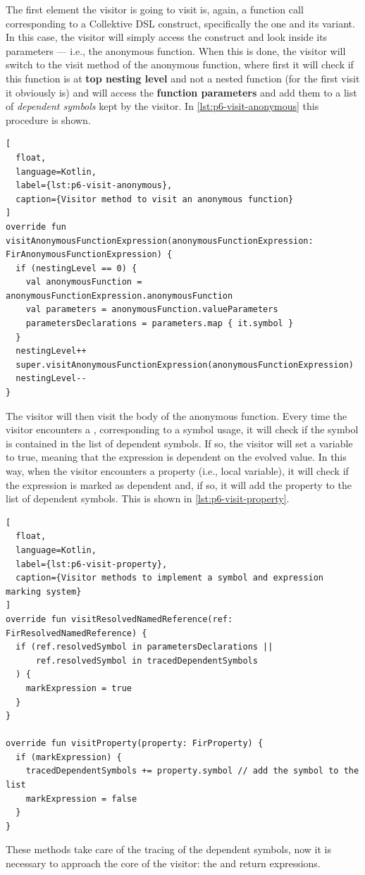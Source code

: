 \documentclass[12pt,a4paper,openright,twoside]{book}
\begin{document}
The first element the visitor is going to visit is, again, a function call
corresponding to a Collektive \ac{DSL} construct, specifically the 
one and its variant. In this case, the visitor will simply access the construct
and look inside its parameters --- i.e., the anonymous function. 
%
When this is done, the visitor will switch to the visit method of the anonymous
function, where first it will check if this function is at \textbf{top nesting
level} and not a nested function (for the first visit it obviously is) and will
access the \textbf{function parameters} and add them to a list of
\emph{dependent symbols} kept by the visitor.
%
In \cref{lst:p6-visit-anonymous} this procedure is shown.
%
\begin{lstlisting}[
  float, 
  language=Kotlin,
  label={lst:p6-visit-anonymous},
  caption={Visitor method to visit an anonymous function}
] 
override fun visitAnonymousFunctionExpression(anonymousFunctionExpression: FirAnonymousFunctionExpression) {
  if (nestingLevel == 0) {
    val anonymousFunction = anonymousFunctionExpression.anonymousFunction
    val parameters = anonymousFunction.valueParameters
    parametersDeclarations = parameters.map { it.symbol }
  }
  nestingLevel++
  super.visitAnonymousFunctionExpression(anonymousFunctionExpression)
  nestingLevel--
}
\end{lstlisting}
%
The visitor will then visit the body of the anonymous function. Every time the
visitor encounters a , corresponding to a
symbol usage, it will check if the symbol is contained in the list of dependent
symbols. If so, the visitor will set a variable  to
true, meaning that the expression is dependent on the evolved value.
%
In this way, when the visitor encounters a property (i.e., local variable), it
will check if the expression is marked as dependent and, if so, it will add the
property to the list of dependent symbols. This is shown in
\cref{lst:p6-visit-property}.
%
\begin{lstlisting}[
  float, 
  language=Kotlin,
  label={lst:p6-visit-property},
  caption={Visitor methods to implement a symbol and expression marking system}
]
override fun visitResolvedNamedReference(ref: FirResolvedNamedReference) {
  if (ref.resolvedSymbol in parametersDeclarations ||
      ref.resolvedSymbol in tracedDependentSymbols
  ) {
    markExpression = true
  }
}

override fun visitProperty(property: FirProperty) {
  if (markExpression) {
    tracedDependentSymbols += property.symbol // add the symbol to the list
    markExpression = false
  }
}
\end{lstlisting}
%
These methods take care of the tracing of the dependent symbols, now it is
necessary to approach the core of the visitor: the  and
return expressions. 
\end{document}
